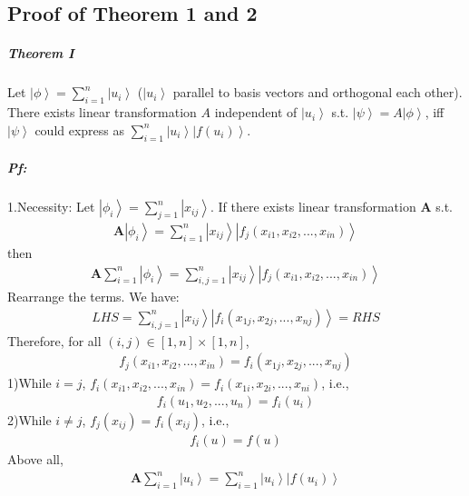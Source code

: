 \documentclass[%
 reprint,
 amsmath,amssymb,
pra,
]{revtex4-1}
\begin{document}
\subsection{Proof of Theorem 1 and 2}\label{ProofOfTheorem}
\subparagraph{Theorem I} Let $\left|\phi\right\rangle = \sum_{i=1}^n \left|u_i\right\rangle$ ($\left|u_i\right\rangle$ parallel to basis vectors and orthogonal each other). There exists 
linear transformation $A$ independent of $\left|u_{i}\right\rangle$ s.t. $\left|\psi\right\rangle = A\left|\phi\right\rangle$, iff $\left|\psi\right\rangle$ could express as $\sum_{i=1}^{n}\left|u_i\right\rangle\left|f\left(u_i\right)\right\rangle$.

\subparagraph{Pf:} 1.Necessity: Let $\left|\phi_i\right\rangle = \sum_{j=1}^n \left|x_{ij}\right\rangle$. If there exists linear transformation $\bm{A}$ s.t.
\begin{align*}
\bm{A}\left|\phi_i\right\rangle = \sum_{i=1}^n\left|x_{ij}\right\rangle\left|f_{j}\left(x_{i1}, x_{i2}, ..., x_{in}\right)\right\rangle
\end{align*}
then
\begin{align*}
\bm{A}\sum_{i=1}^{n}\left|\phi_i\right\rangle = \sum_{i, j=1}^n\left|x_{ij}\right\rangle\left|f_{j}\left(x_{i1}, x_{i2}, ..., x_{in}\right)\right\rangle
\end{align*}
Rearrange the terms. We have: 
\begin{align*}
LHS = \sum_{i, j=1}^n\left|x_{ij}\right\rangle\left|f_{i}\left(x_{1j}, x_{2j}, ..., x_{nj}\right)\right\rangle = RHS
\end{align*}
Therefore, for all $\left(i, j\right) \in \left[1, n\right]\times\left[1, n\right]$, 
\begin{align*}
f_{j}\left(x_{i1}, x_{i2}, ..., x_{in}\right) = f_{i}\left(x_{1j}, x_{2j}, ..., x_{nj}\right)
\end{align*}
1)While $i=j$, $f_{i}\left(x_{i1}, x_{i2}, ..., x_{in}\right) = f_{i}\left(x_{1i}, x_{2i}, ..., x_{ni}\right)$, i.e., 
\begin{align*}
f_i\left(u_1, u_2, ...,u_n\right) = f_i\left(u_i\right)
\end{align*}
2)While $i\neq j$, $f_j\left(x_{ij}\right) = f_i\left(x_{ij}\right)$, i.e., 
\begin{align*}
f_i\left(u\right) = f\left(u\right)
\end{align*}
Above all, 
\begin{align*}
\bm{A}\sum_{i=1}^{n}\left|u_i\right\rangle = \sum_{i=1}^{n}\left|u_i\right\rangle\left|f\left(u_i\right)\right\rangle
\end{align*}
\end{document}
